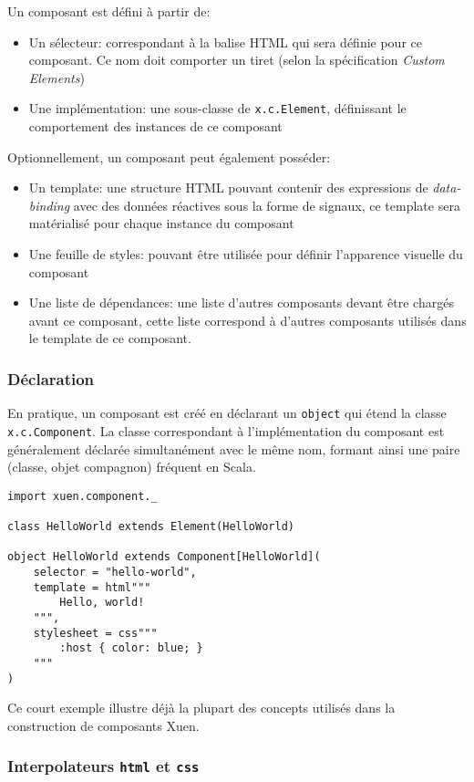 Un composant est défini à partir de:
\begin{itemize}
	\item Un sélecteur: correspondant à la balise HTML qui sera définie pour ce composant. Ce nom doit comporter un tiret (selon la spécification \emph{Custom Elements})
	\item Une implémentation: une sous-classe de \texttt{x.c.Element}, définissant le comportement des instances de ce composant
\end{itemize}
Optionnellement, un composant peut également posséder:
\begin{itemize}
	\item Un template: une structure HTML pouvant contenir des expressions de \emph{data-binding} avec des données réactives sous la forme de signaux, ce template sera matérialisé pour chaque instance du composant 
	\item Une feuille de styles: pouvant être utilisée pour définir l'apparence visuelle du composant
	\item Une liste de dépendances: une liste d'autres composants devant être chargés avant ce composant, cette liste correspond à d'autres composants utilisés dans le template de ce composant.
\end{itemize}

\subsubsection{Déclaration}
En pratique, un composant est créé en déclarant un \texttt{object} qui étend la classe \texttt{x.c.Component}. La classe correspondant à l'implémentation du composant est généralement déclarée simultanément avec le même nom, formant ainsi une paire (classe, objet compagnon) fréquent en Scala.

\begin{lstlisting}
import xuen.component._

class HelloWorld extends Element(HelloWorld)

object HelloWorld extends Component[HelloWorld](
	selector = "hello-world",
	template = html"""
		Hello, world!
	""",
	stylesheet = css"""
		:host { color: blue; }
	"""
)
\end{lstlisting}

Ce court exemple illustre déjà la plupart des concepts utilisés dans la construction de composants Xuen.

\subsubsection{Interpolateurs \texttt{html} et \texttt{css}}

